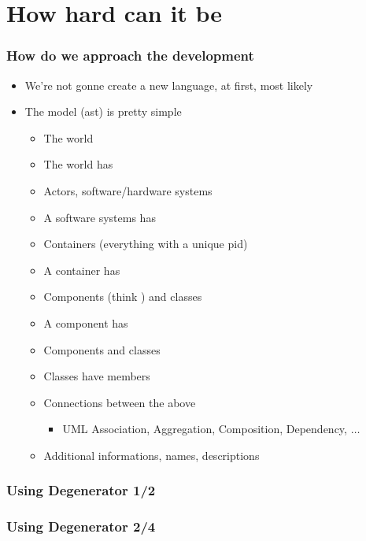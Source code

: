 \documentclass[xelatex,14pt]{beamer}
\begin{document}
\section{How hard can it be}
\begin{frame}
	\frametitle{How do we approach the development}
	\begin{itemize}
		\item We're not gonne create a new language\pause, at first\pause,
			most likely
			\pause
		\item The model (ast) is pretty simple
			\pause
		\begin{itemize}
			\item The world
			\item The world has
			\item Actors, software/hardware systems
			\item A software systems has
			\item Containers (everything with a unique pid)
			\item A container has
			\item Components (think \lstinline@module@) and classes
			\item A component has
			\item Components and classes
			\item Classes have members
				\pause
			\item Connections between the above
			\begin{itemize}
				\item UML Association, Aggregation, Composition, Dependency, \(\dots\)
			\end{itemize}
			\item Additional informations, names, descriptions
		\end{itemize}
	\end{itemize}
\end{frame}

\begin{frame}
	\frametitle{Using Degenerator 1/2}
	
	\pause
	
\end{frame}
\begin{frame}
	\frametitle{Using Degenerator 2/4}
	
	\pause
	
\end{frame}
\end{document}
